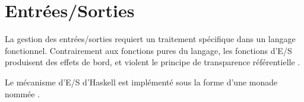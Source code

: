\part{Entrées/Sorties}

\begin{introduction}
La gestion des entrées/sorties requiert un traitement spécifique dans un langage fonctionnel. Contrairement aux fonctions pures du langage, les fonctions d'E/S produisent des effets de bord, et violent le principe de transparence référentielle .

Le mécanisme d'E/S d'Haskell est implémenté sous la forme d'une monade  nommée .
\end{introduction}
